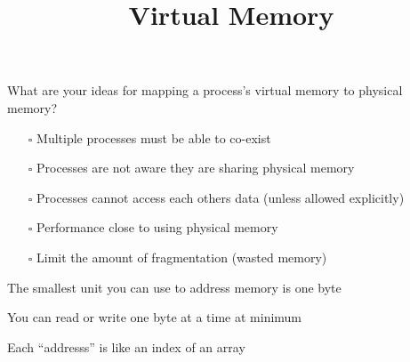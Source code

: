 

\title{Virtual Memory}



  \begin{frame}
    \titlepage
  \end{frame}

  \begin{slide}
    

    What are your ideas for mapping a process's virtual memory to physical
    memory?

  \end{slide}

  \begin{slide}


    \begin{itemize}
      \item [$\square$] Multiple processes must be able to co-exist
      \item [$\square$] Processes are not aware they are sharing physical memory
      \item [$\square$] Processes cannot access each others data (unless allowed explicitly)
      \item [$\square$] Performance close to using physical memory
      \item [$\square$] Limit the amount of fragmentation (wasted memory)
    \end{itemize}

  \end{slide}

  \begin{slide}
    

    The smallest unit you can use to address memory is one byte
    \medskip

    You can read or write one byte at a time at minimum
    \medskip

    Each ``addresss'' is like an index of an array

  \end{slide}

